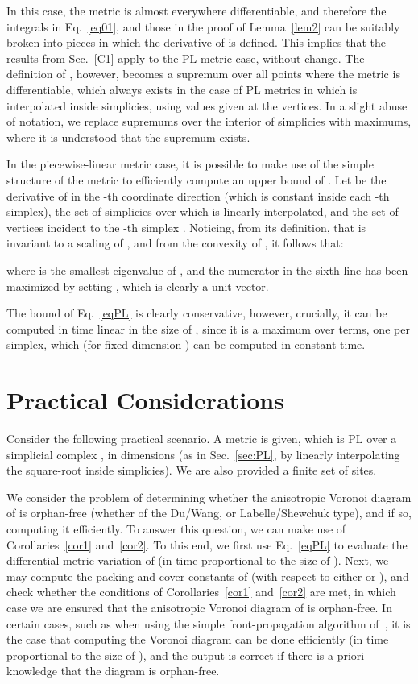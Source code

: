 \documentclass[11pt]{article}
\begin{document}
In this case, the metric is almost everywhere differentiable, and therefore the integrals in Eq.~\ref{eq01}, 
	and those in the proof of Lemma~\ref{lem2} can be suitably broken into pieces in which the derivative of  is defined. 
This implies that the results from Sec.~\ref{C1} apply to the PL metric case, without change. 
The definition of , however, becomes a supremum over all points where the metric is differentiable, which always exists in the case of PL metrics in which  is 
interpolated inside simplicies, using values given at the vertices. 
In a slight abuse of notation, we replace supremums over the interior of simplicies with maximums, where it is understood that the supremum exists. 

In the piecewise-linear metric case, it is possible to make use of the simple structure of the metric to efficiently compute an upper bound of . 
Let  be the derivative of  in the -th coordinate direction (which is constant inside each -th simplex), 
	 the set of simplicies over which  is linearly interpolated, 
	and  the set of vertices incident to the -th simplex .
Noticing, from its definition, that  is invariant to a scaling of ,  and from the convexity of , it follows that:

where  is the smallest eigenvalue of , and the numerator in the sixth line has been maximized by setting
, which is clearly a unit vector. 



The bound of Eq.~\ref{eqPL} is clearly conservative, however, crucially, it can be computed in time linear in the size of , since it is a maximum over terms, one per simplex, 
	which (for fixed dimension ) can be computed in constant time. 






\section{Practical Considerations}

Consider the following practical scenario. 
A metric  is given, which is PL over a simplicial complex , in  dimensions (as in Sec.~\ref{sec:PL}, by linearly interpolating the square-root  inside simplicies). 
We are also provided a finite set  of sites. 

We consider the problem of determining whether the anisotropic Voronoi diagram of  is orphan-free (whether of the Du/Wang, or Labelle/Shewchuk type), and if so, computing it efficiently. 
To answer this question, we can make use of Corollaries~\ref{cor1} and~\ref{cor2}. 
To this end, we first use Eq.~\ref{eqPL} to evaluate the differential-metric variation  of  (in time proportional to the size of ). 
Next, we may compute the packing and cover constants of  (with respect to either  or ), and check whether  the conditions of Corollaries~\ref{cor1} and~\ref{cor2} are met, 
	in which case we are ensured that the anisotropic Voronoi diagram of  is orphan-free. 
In certain cases, such as when using the simple front-propagation algorithm of~\cite{adt}, it is the case that computing the Voronoi diagram can be done efficiently (in time proportional to the size of ), and the output is correct if there is a priori knowledge that the diagram is orphan-free. 
\end{document}

